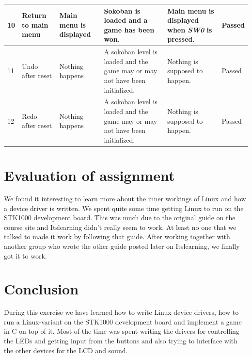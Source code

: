 \documentclass[a4paper,11pt]{article}
\begin{document}
\begin{center}
\begin{tabular}[pos]{|m{35pt}|m{45pt}|m{80pt}|m{90pt}|m{105pt}|m{40pt}|}
\hline 10 & Return to main menu & Main menu is displayed & Sokoban is loaded and a game has been won. & Main menu is displayed when \emph{SW0} is pressed.  & Passed \\

\hline 11 & Undo after reset & Nothing happens & A sokoban level is loaded and the game may or may not have been initialized. & Nothing is supposed to happen.  & Passed \\

\hline 12 & Redo after reset & Nothing happens & A sokoban level is loaded and the game may or may not have been initialized. & Nothing is supposed to happen.  & Passed \\

\hline 
\end{tabular} 
\end{center}

\newpage

\section{Evaluation of assignment}
We found it interesting to learn more about the inner workings of Linux and how a device driver is written. We spent quite some time getting Linux to run on the STK1000 development board. This was much due to the original guide on the course site and Itslearning didn't really seem to work. At least no one that we talked to made it work by following that guide. After working together with another group who wrote the other guide posted later on Itslearning, we finally got it to work. 

\section{Conclusion}
During this exercise we have learned how to write Linux device drivers, how to run a Linux-variant on the STK1000 development board and implement a game in C on top of it. Most of the time was spent writing the drivers for controlling the LEDs and getting input from the buttons and also trying to interface with the other devices for the LCD and sound. 
\end{document}
